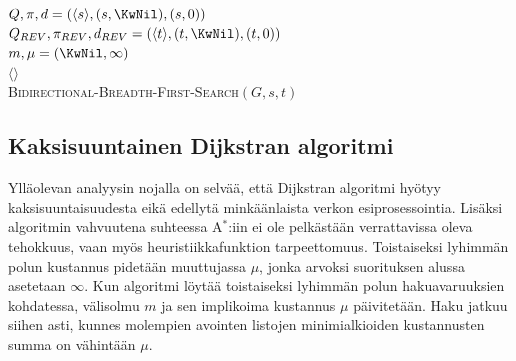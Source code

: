 \documentclass[finnish]{tktltiki2}
\newenvironment{finalgo}[1][htb]{
  \renewcommand{\algorithmcfname}{Algoritmi}
  \begin{algorithm}[#1]
}{\end{algorithm}}
\theoremstyle{definition}
\theoremstyle{remark}
\begin{document}
\begin{finalgo}[p]
  $Q, \pi, d = (\langle s \rangle, (s, \KwNil), (s, 0))$ \\
  $Q_{REV}, \pi_{REV}, d_{REV} = (\langle t \rangle, (t, \KwNil), (t, 0))$ \\
  $m, \mu = (\KwNil, \infty)$ \\
  \KwRet $\langle \rangle$ \\
\caption{\textsc{Bidirectional-Breadth-First-Search}$(G, s, t)$}
\end{finalgo}

\subsection{Kaksisuuntainen Dijkstran algoritmi}
Ylläolevan analyysin nojalla on selvää, että Dijkstran algoritmi hyötyy kaksisuuntaisuudesta eikä edellytä minkäänlaista verkon esiprosessointia. Lisäksi algoritmin vahvuutena suhteessa A$^{\ast}$:iin ei ole pelkästään verrattavissa oleva tehokkuus, vaan myös heuristiikkafunktion tarpeettomuus. Toistaiseksi lyhimmän polun kustannus pidetään muuttujassa $\mu$, jonka arvoksi suorituksen alussa asetetaan $\infty$. Kun algoritmi löytää toistaiseksi lyhimmän polun hakuavaruuksien kohdatessa, välisolmu $m$ ja sen implikoima kustannus $\mu$ päivitetään. Haku jatkuu siihen asti, kunnes molempien avointen listojen minimialkioiden kustannusten summa on vähintään $\mu$. 
\end{document}
